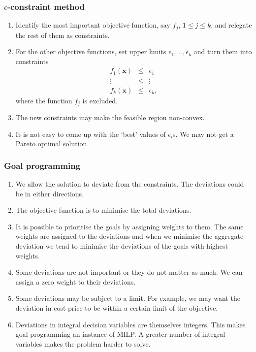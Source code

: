 \documentclass{beamer}
\begin{document}
\begin{frame}
\frametitle{$\epsilon$-constraint method}
\begin{enumerate}
\item Identify the most important objective function, say $f_j$, $1\le j\le k$,
and relegate the rest of them as constraints.
\item For the other objective functions, set upper limits $\epsilon_1, \ldots, 
\epsilon_k$ and turn them into constraints
\begin{eqnarray*}
f_1(\bm{x}) &\le& \epsilon_1 \\
\vdots &\le& \vdots \\
f_k(\bm{x}) &\le& \epsilon_k,
\end{eqnarray*}
where the function $f_j$ is excluded.
\item The new constraints may make the feasible region non-convex.
\item It is not easy to come up with the `best' values of $\epsilon_i$s. We may
not get a Pareto optimal solution.
\end{enumerate}
\end{frame}

\begin{frame}
\frametitle{Goal programming}
\begin{enumerate}
\item We allow the solution to deviate from the constraints. The deviations
could be in either directions.
\item The objective function is to minimise the total deviations.
\item It is possible to prioritise the goals by assigning weights to them. The
same weights are assigned to the deviations and when we minimise the aggregate
deviation we tend to minimise the deviations of the goals with highest weights.
\item Some deviations are not important or they do not matter as much. We can
assign a zero weight to their deviations.
\item Some deviations may be subject to a limit. For example, we may want the
deviation in cost price to be within a certain limit of the objective.
\item Deviations in integral decision variables are themselves integers. This 
makes goal programming an instance of MILP. A greater number of integral 
variables makes the problem harder to solve.
\end{enumerate}
\end{frame}
\end{document}
